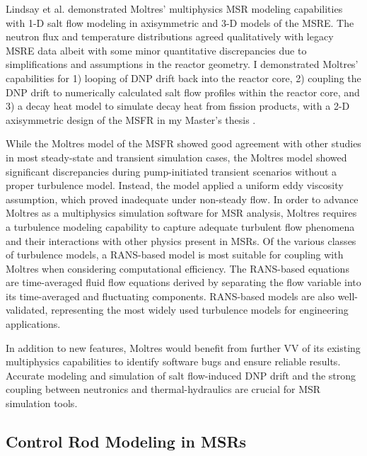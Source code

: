Lindsay et al. \cite{lindsay_introduction_2018}
demonstrated Moltres' multiphysics \gls{MSR} modeling capabilities with 1-D salt
flow modeling in axisymmetric and 3-D models of the \gls{MSRE}. The neutron flux and
temperature distributions agreed qualitatively with legacy
\gls{MSRE} data albeit with some minor quantitative discrepancies due to
simplifications and assumptions in the reactor geometry. I demonstrated Moltres' capabilities for
1) looping of \gls{DNP} drift back into the reactor core, 2) coupling the \gls{DNP}
drift to numerically calculated salt flow profiles within the reactor core,
and 3) a decay heat model to simulate decay heat from fission products, with a 2-D axisymmetric
design of the \gls{MSFR} in my Master's thesis \cite{park_advancement_2020}.

While the Moltres
model of the \gls{MSFR} showed good agreement with other studies in most steady-state and transient
simulation cases, the Moltres model showed significant discrepancies during pump-initiated
transient scenarios without a proper turbulence model. Instead, the model applied a
uniform eddy viscosity assumption, which proved inadequate under non-steady flow. In order to
advance Moltres as a multiphysics simulation software for \gls{MSR} analysis, Moltres requires a
turbulence modeling capability to capture adequate turbulent flow phenomena and their interactions
with other physics present in \glspl{MSR}. Of the various classes of turbulence models, a
\gls{RANS}-based model is most suitable for coupling with Moltres when considering computational
efficiency. The \gls{RANS}-based equations are time-averaged fluid flow equations
derived by separating the flow variable into its time-averaged and fluctuating components.
\gls{RANS}-based models are also well-validated, representing the most widely used turbulence
models for engineering applications.

In addition to new features, Moltres would benefit from further \gls{VV} of its existing
multiphysics capabilities to identify software bugs and ensure reliable results. Accurate modeling
and simulation of salt flow-induced \gls{DNP} drift and the strong coupling between neutronics and
thermal-hydraulics are crucial for \gls{MSR} simulation tools.

\subsection{Control Rod Modeling in \glspl{MSR}}

